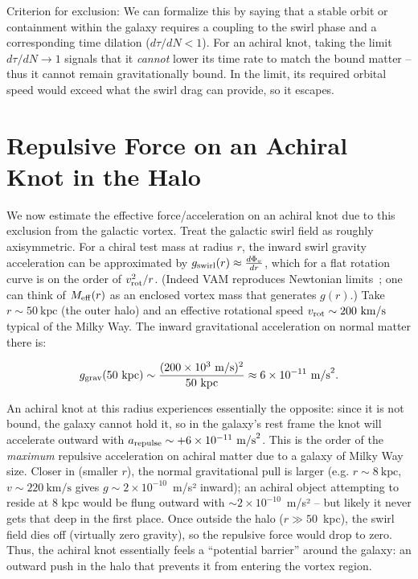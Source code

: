 \documentclass[11pt]{article}
\begin{document}
Criterion for exclusion: We can formalize this by saying that a stable orbit or containment within the galaxy requires a coupling to the swirl phase and a corresponding time dilation ($d\tau/dN < 1$). For an achiral knot, taking the limit $d\tau/dN \to 1$ signals that it \textit{cannot} lower its time rate to match the bound matter -- thus it cannot remain gravitationally bound. In the limit, its required orbital speed would exceed what the swirl drag can provide, so it escapes.

\section*{Repulsive Force on an Achiral Knot in the Halo}

We now estimate the effective force/acceleration on an achiral knot due to this exclusion from the galactic vortex. Treat the galactic swirl field as roughly axisymmetric. For a chiral test mass at radius $r$, the inward swirl gravity acceleration can be approximated by $g_{\rm swirl}(r) \approx \frac{d\Phi_v}{dr}$, which for a flat rotation curve is on the order of $v_{\rm rot}^2/r$. (Indeed VAM reproduces Newtonian limits~\cite{iskandarani2025vam2}; one can think of $M_{\rm eff}(r)$ as an enclosed vortex mass that generates $g(r)$.) Take $r \sim 50~\text{kpc}$ (the outer halo) and an effective rotational speed $v_{\rm rot}\sim 200~\text{km/s}$ typical of the Milky Way. The inward gravitational acceleration on normal matter there is:

\[
g_{\rm grav}(50~\text{kpc}) \sim \frac{(200\times10^3~\text{m/s})^2}{50~\text{kpc}} \approx 6\times10^{-11}~\text{m/s}^2.
\]

An achiral knot at this radius experiences essentially the opposite: since it is not bound, the galaxy cannot hold it, so in the galaxy’s rest frame the knot will accelerate outward with $a_{\rm repulse} \sim +6\times10^{-11}~\text{m/s}^2$. This is the order of the \textit{maximum} repulsive acceleration on achiral matter due to a galaxy of Milky Way size. Closer in (smaller $r$), the normal gravitational pull is larger (e.g. $r\sim 8~\text{kpc}$, $v\sim220~\text{km/s}$ gives $g\sim2\times10^{-10}$~m/s² inward); an achiral object attempting to reside at 8 kpc would be flung outward with $\sim2\times10^{-10}$~m/s² – but likely it never gets that deep in the first place. Once outside the halo ($r \gg 50$~kpc), the swirl field dies off (virtually zero gravity), so the repulsive force would drop to zero. Thus, the achiral knot essentially feels a “potential barrier” around the galaxy: an outward push in the halo that prevents it from entering the vortex region.
\end{document}
